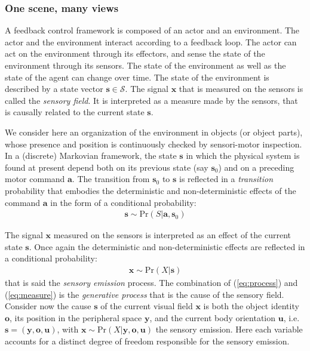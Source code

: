 \documentclass[12pt,twoside,openright]{article}
\begin{document}
\subsubsection{One scene, many views}

A feedback control framework is composed of an actor and an environment. The actor and the environment interact according to a feedback loop. 
The actor can act on the environment through its effectors, and sense the state of the environment through its sensors. 
The state of the environment as well as the state of the agent can change over time. The state of the environment is described by a state vector $\boldsymbol{s} \in \mathcal{S}$.
The signal $\boldsymbol{x}$ that is measured on the sensors is called the \emph{sensory field}. It is interpreted as a measure made by the sensors, that is causally related to the current state $\boldsymbol{s}$. 

We consider here an organization of the environment in objects (or object parts), whose presence and position is continuously checked by sensori-motor inspection.
In a (discrete) Markovian framework, the state $\boldsymbol{s}$ in which the physical system is found at present depend both on its previous state (say $\boldsymbol{s}_0$) and on a preceding motor command $\boldsymbol{a}$.
The transition from $\boldsymbol{s}_0$ to $\boldsymbol{s}$ is reflected in a \emph{transition} probability that embodies the deterministic and non-deterministic effects of the command $\boldsymbol{a}$ in the form of a conditional probability:  
\begin{align}
\boldsymbol{s} \sim \text{Pr}(S|\boldsymbol{a},\boldsymbol{s}_0) \label{eq:process}
\end{align}

The signal $\boldsymbol{x}$ measured on the sensors is interpreted as an effect of the current state $\boldsymbol{s}$. Once again the deterministic and non-deterministic effects are reflected in a conditional probability:
\begin{align}
\boldsymbol{x} \sim \text{Pr}(X|\boldsymbol{s})\label{eq:measure}
\end{align}
that is said the \emph{sensory emission} process.
The combination of  (\ref{eq:process}) and (\ref{eq:measure}) is the \emph{generative process} that is the cause of the sensory field.
Consider now the cause $\boldsymbol{s}$ of the current visual field $\boldsymbol{x}$ is both the object identity $\boldsymbol{o}$, its position in the peripheral space $\boldsymbol{y}$, and the current body orientation  $\boldsymbol{u}$, i.e. $\boldsymbol{s} = (\boldsymbol{y},\boldsymbol{o},\boldsymbol{u})$, with $\boldsymbol{x} \sim \text{Pr}(X|\boldsymbol{y},\boldsymbol{o},\boldsymbol{u})$ the  sensory emission. Here each variable accounts for a distinct degree of freedom responsible for the sensory emission. %
\end{document}
